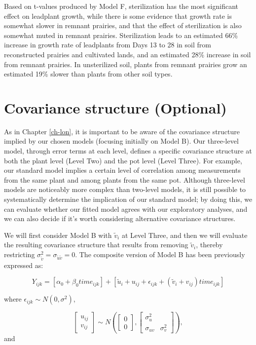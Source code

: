 \documentclass[
]{krantz}
\begin{document}
Based on t-values produced by Model F, sterilization has the most significant effect on leadplant growth, while there is some evidence that growth rate is somewhat slower in remnant prairies, and that the effect of sterilization is also somewhat muted in remnant prairies. Sterilization leads to an estimated 66\% increase in growth rate of leadplants from Days 13 to 28 in soil from reconstructed prairies and cultivated lands, and an estimated 28\% increase in soil from remnant prairies. In unsterilized soil, plants from remnant prairies grow an estimated 19\% slower than plants from other soil types.

\hypertarget{error-3level}{%
\section{Covariance structure (Optional)}\label{error-3level}}

As in Chapter \ref{ch-lon}, it is important to be aware of the covariance structure implied by our chosen models (focusing initially on Model B). Our three-level model, through error terms at each level, defines a specific covariance structure at both the plant level (Level Two) and the pot level (Level Three). For example, our standard model implies a certain level of correlation among measurements from the same plant and among plants from the same pot. Although three-level models are noticeably more complex than two-level models, it is still possible to systematically determine the implication of our standard model; by doing this, we can evaluate whether our fitted model agrees with our exploratory analyses, and we can also decide if it's worth considering alternative covariance structures.

We will first consider Model B with \(\tilde{v}_{i}\) at Level Three, and then we will evaluate the resulting covariance structure that results from removing \(\tilde{v}_{i}\), thereby restricting \(\sigma_{\tilde{v}}^{2}=\sigma_{\tilde{u}\tilde{v}}=0\). The composite version of Model B has been previously expressed as:

\begin{equation}
Y_{ijk}=[\alpha_{0}+\beta_{0}\textstyle{time}_{ijk}]+
[\tilde{u}_{i}+u_{ij}+\epsilon_{ijk}+(\tilde{v}_{i}+v_{ij})\textstyle{time}_{ijk}]
\label{eq:modbcomp}
\end{equation}

where \(\epsilon_{ijk}\sim N(0,\sigma^2)\),

\[ \left[ \begin{array}{c}
            u_{ij} \\ v_{ij}
          \end{array}  \right] \sim N \left( \left[
          \begin{array}{c}
            0 \\ 0
          \end{array} \right], \left[
          \begin{array}{cc}
            \sigma_{u}^{2} & \\
            \sigma_{uv} & \sigma_{v}^{2}
          \end{array} \right] \right), \] and
\end{document}
